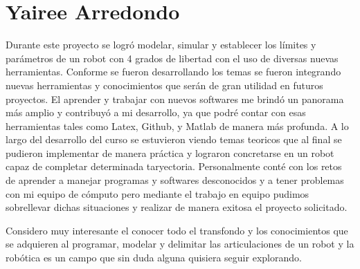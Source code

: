 \section{Yairee Arredondo}

Durante este proyecto se logró modelar, simular y establecer los límites y parámetros de un robot con 4 grados de libertad con el uso de diversas nuevas herramientas. Conforme se fueron desarrollando los temas se fueron integrando nuevas herramientas y conocimientos que serán de gran utilidad en futuros proyectos. 
El aprender y trabajar con nuevos softwares me brindó un panorama más amplio y contribuyó a mi desarrollo, ya que podré contar con esas herramientas tales como Latex, Github, y Matlab de manera más profunda. 
A lo largo del desarrollo del curso se estuvieron viendo temas teoricos que al final se pudieron implementar de manera práctica y lograron concretarse en un robot capaz de completar determinada taryectoria.
Personalmente conté con los retos de aprender a manejar programas y softwares desconocidos y a tener problemas con mi equipo de cómputo  pero mediante el trabajo en equipo pudimos sobrellevar dichas situaciones y realizar de manera exitosa el proyecto solicitado. 

Considero muy interesante el conocer todo el transfondo y los conocimientos que se adquieren al programar, modelar y delimitar las articulaciones de un robot y la robótica es un campo que sin duda alguna quisiera seguir explorando.